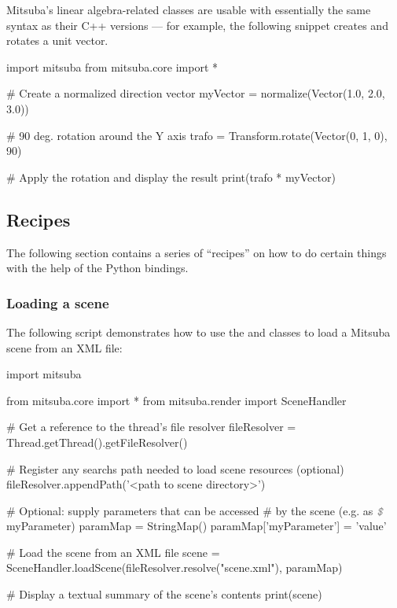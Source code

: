 Mitsuba's linear algebra-related classes are usable with essentially the
same syntax as their C++ versions --- for example, the following snippet 
creates and rotates a unit vector.
\begin{python}
import mitsuba
from mitsuba.core import *

# Create a normalized direction vector
myVector = normalize(Vector(1.0, 2.0, 3.0))

# 90 deg. rotation around the Y axis
trafo = Transform.rotate(Vector(0, 1, 0), 90)

# Apply the rotation and display the result
print(trafo * myVector)
\end{python}

\subsection{Recipes}
The following section contains a series of ``recipes'' on how to do
certain things with the help of the Python bindings.

\subsubsection{Loading a scene}
The following script demonstrates how to use the
 and  classes to 
load a Mitsuba scene from an XML file:
\begin{python}
import mitsuba

from mitsuba.core import *
from mitsuba.render import SceneHandler

# Get a reference to the thread's file resolver
fileResolver = Thread.getThread().getFileResolver()

# Register any searchs path needed to load scene resources (optional)
fileResolver.appendPath('<path to scene directory>')

# Optional: supply parameters that can be accessed 
# by the scene (e.g. as $\text{\color{lstcomment}\itshape\texttt{\$}}$myParameter)
paramMap = StringMap()
paramMap['myParameter'] = 'value'

# Load the scene from an XML file
scene = SceneHandler.loadScene(fileResolver.resolve("scene.xml"), paramMap)

# Display a textual summary of the scene's contents
print(scene)
\end{python}

